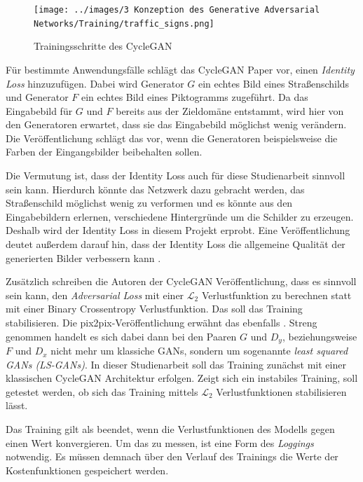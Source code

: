 \begin{figure}[h]
	\centering
	\texttt{[image: ../images/3 Konzeption des Generative Adversarial Networks/Training/traffic\_signs.png]}
	\caption{Trainingsschritte des \ac{CycleGAN}}
	\label{fig:training}
\end{figure}

Für bestimmte Anwendungsfälle schlägt das \ac{CycleGAN} Paper vor, einen \emph{Identity Loss} hinzuzufügen. Dabei wird Generator $G$ ein echtes Bild eines Straßenschilds und Generator $F$ ein echtes Bild eines Piktogramms zugeführt. Da das Eingabebild für $G$ und $F$ bereits aus der Zieldomäne entstammt, wird hier von den Generatoren erwartet, dass sie das Eingabebild möglichst wenig verändern. Die Veröffentlichung schlägt das vor, wenn die Generatoren beispielsweise die Farben der Eingangsbilder beibehalten sollen. \cite{cycleGAN}

Die Vermutung ist, dass der Identity Loss auch für diese Studienarbeit sinnvoll sein kann. Hierdurch könnte das Netzwerk dazu gebracht werden, das Straßenschild möglichst wenig zu verformen und es könnte aus den Eingabebildern erlernen, verschiedene Hintergründe um die Schilder zu erzeugen. Deshalb wird der Identity Loss in diesem Projekt erprobt. Eine Veröffentlichung deutet außerdem darauf hin, dass der Identity Loss die allgemeine Qualität der generierten Bilder verbessern kann \cite{identity-loss}. \cite{cycleGAN}

Zusätzlich schreiben die Autoren der \ac{CycleGAN} Veröffentlichung, dass es sinnvoll sein kann, den \emph{Adversarial Loss} mit einer $\mathcal{L}_2$ Verlustfunktion zu berechnen statt mit einer Binary Crossentropy Verlustfunktion. Das soll das Training stabilisieren. Die pix2pix-Veröffentlichung erwähnt das ebenfalls \cite{pix2pix}. Streng genommen handelt es sich dabei dann bei den Paaren $G$ und $D_y$, beziehungsweise $F$ und $D_x$ nicht mehr um klassiche \acp{GAN}, sondern um sogenannte \emph{least squared \acp{GAN} (LS-GANs)}. In dieser Studienarbeit soll das Training zunächst mit einer klassischen \ac{CycleGAN} Architektur erfolgen. Zeigt sich ein instabiles Training, soll getestet werden, ob sich das Training mittels $\mathcal{L}_2$ Verlustfunktionen stabilisieren lässt. \cite{cycleGAN}

Das Training gilt als beendet, wenn die Verlustfunktionen des Modells gegen einen Wert konvergieren. Um das zu messen, ist eine Form des \emph{Loggings} notwendig. Es müssen demnach über den Verlauf des Trainings die Werte der Kostenfunktionen gespeichert werden. 